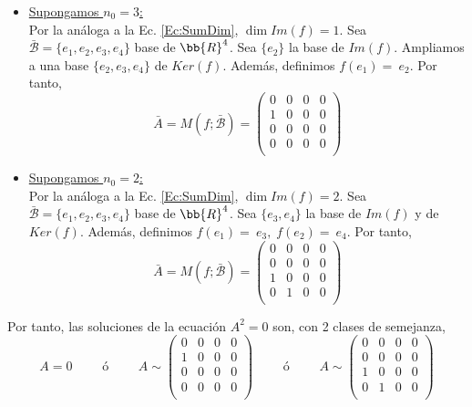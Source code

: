 \begin{ejercicio}
\begin{enumerate}
\begin{itemize}
           \item \underline{Supongamos $n_0 = 3$:}\\
           Por la análoga a la Ec. \ref{Ec:SumDim}, $\dim Im(f)=1$. Sea $\bar{\mathcal{B}}=\{e_1, e_2, e_3, e_4\}$ base de $\bb{R}^4$. Sea $\{e_2\}$ la base de $Im(f)$. Ampliamos a una base $\{e_2, e_3, e_4\}$ de $Ker(f)$. Además, definimos $f(e_1)=~e_2$.
           Por tanto,
           $$\bar{A} = M(f; \bar{\mathcal{B}}) = \left( \begin{array}{cccc}
               0 & 0 & 0 & 0\\
               1 & 0 & 0 & 0\\
               0 & 0 & 0 & 0\\
               0 & 0 & 0 & 0\\
           \end{array}\right)$$

           \item \underline{Supongamos $n_0 = 2$:}\\
           Por la análoga a la Ec. \ref{Ec:SumDim}, $\dim Im(f)=2$. Sea $\bar{\mathcal{B}}=\{e_1, e_2, e_3, e_4\}$ base de $\bb{R}^4$. Sea $\{e_3, e_4\}$ la base de $Im(f)$ y de $Ker(f)$. Además, definimos $f(e_1)=~e_3,\;f(e_2)=~e_4$.
           Por tanto,
           $$\bar{A} = M(f; \bar{\mathcal{B}}) = \left( \begin{array}{cccc}
               0 & 0 & 0 & 0\\
               0 & 0 & 0 & 0\\
               1 & 0 & 0 & 0\\
               0 & 1 & 0 & 0\\
           \end{array}\right)$$
       \end{itemize}
    
       Por tanto, las soluciones de la ecuación $A^2 = 0$ son, con 2 clases de semejanza,
       \begin{equation*}
           A = 0
           \qquad \text{ ó } \qquad
           A\sim \left( \begin{array}{cccc}
               0 & 0 & 0 & 0\\
               1 & 0 & 0 & 0\\
               0 & 0 & 0 & 0\\
               0 & 0 & 0 & 0\\
           \end{array}\right)
           \qquad \text{ ó } \qquad
           A\sim \left( \begin{array}{cccc}
               0 & 0 & 0 & 0\\
               0 & 0 & 0 & 0\\
               1 & 0 & 0 & 0\\
               0 & 1 & 0 & 0\\
           \end{array}\right)
       \end{equation*}


\end{enumerate}
\end{ejercicio}
